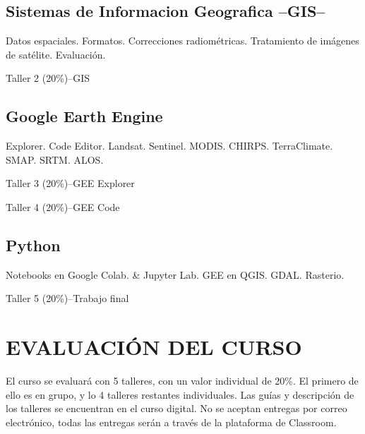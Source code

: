 \documentclass[a4paper,twoside,11pt,]{article}
\begin{document}
\subsection {Sistemas de Informacion Geografica --GIS--}
Datos espaciales. Formatos. Correcciones radiométricas.  Tratamiento de imágenes de satélite. Evaluación.
\begin{tcolorbox}[enhanced,width=5in,center upper,  fontupper=\large\bfseries,drop shadow southwest,sharp corners]
Taller 2 (20\%)--GIS
\end{tcolorbox}

\subsection {Google Earth Engine}
Explorer. Code Editor. Landsat. Sentinel. MODIS. CHIRPS. TerraClimate. SMAP. SRTM. ALOS.
\begin{tcolorbox}[enhanced,width=5in,center upper,  fontupper=\large\bfseries,drop shadow southwest,sharp corners]
Taller 3 (20\%)--GEE Explorer
\end{tcolorbox}
\begin{tcolorbox}[enhanced,width=5in,center upper,  fontupper=\large\bfseries,drop shadow southwest,sharp corners]
Taller 4 (20\%)--GEE Code
\end{tcolorbox}

\subsection {Python}
Notebooks en Google Colab. \& Jupyter Lab. GEE en QGIS. GDAL. Rasterio.
\begin{tcolorbox}[enhanced,width=5in,center upper,  fontupper=\large\bfseries,drop shadow southwest,sharp corners]
Taller 5 (20\%)--Trabajo final
\end{tcolorbox}

\section{EVALUACIÓN DEL CURSO}
El curso se evaluará con 5 talleres, con un valor individual de 20\%. El primero de ello es en grupo, y lo 4 talleres restantes individuales. Las guías y descripción de los talleres se encuentran en el curso digital. No se aceptan entregas por correo electrónico, todas las entregas serán a través de la plataforma de Classroom.
\end{document}
